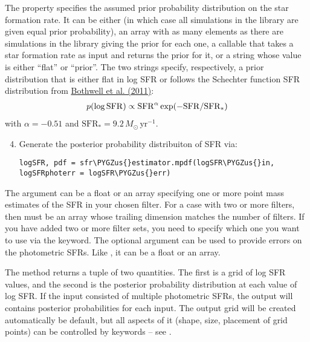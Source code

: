 \documentclass[letterpaper,10pt,english]{sphinxmanual}
\def\PYGZus{\char`\_}
\begin{document}
The  property specifies the assumed prior probability distribution on the star formation rate. It can be either  (in which case all simulations in the library are given equal prior probability), an array with as many elements as there are simulations in the library giving the prior for each one, a callable that takes a star formation rate as input and returns the prior for it, or a string whose value is either ``flat'' or ``prior''. The two strings specify, respectively, a prior distribution that is either flat in log SFR or follows the Schechter function SFR distribution from \href{http://adsabs.harvard.edu/abs/2011MNRAS.415.1815B}{Bothwell et al. (2011)}:
\begin{gather}
\begin{split}p(\log\mathrm{SFR}) \propto \mathrm{SFR}^{\alpha} \exp(-\mathrm{SFR}/\mathrm{SFR}_*)\end{split}\notag
\end{gather}
with \(\alpha = -0.51\) and \(\mathrm{SFR}_* = 9.2\,M_\odot\,\mathrm{yr}^{-1}\).
\begin{enumerate}
\setcounter{enumi}{3}
\item {} 
Generate the posterior probability distribuiton of SFR via:

\begin{Verbatim}[commandchars=\\\{\}]
logSFR, pdf = sfr\PYGZus{}estimator.mpdf(logSFR\PYGZus{}in, logSFRphoterr = logSFR\PYGZus{}err)
\end{Verbatim}

\end{enumerate}

The argument  can be a float or an array specifying one or more point mass estimates of the SFR in your chosen filter. For a case with two or more filters, then  must be an array whose trailing dimension matches the number of filters. If you have added two or more filter sets, you need to specify which one you want to use via the  keyword. The optional argument  can be used to provide errors on the photometric SFRs. Like , it can be a float or an array.

The  method returns a tuple of two quantities. The first is a grid of log SFR values, and the second is the posterior probability distribution at each value of log SFR. If the input consisted of multiple photometric SFRs, the output will contains posterior probabilities for each input. The output grid will be created automatically be default, but all aspects of it (shape, size, placement of grid points) can be controlled by keywords -- see {\hyperref[sfr_slug:sec-sfr-slug-full]{\emph{}}}.
\end{document}
